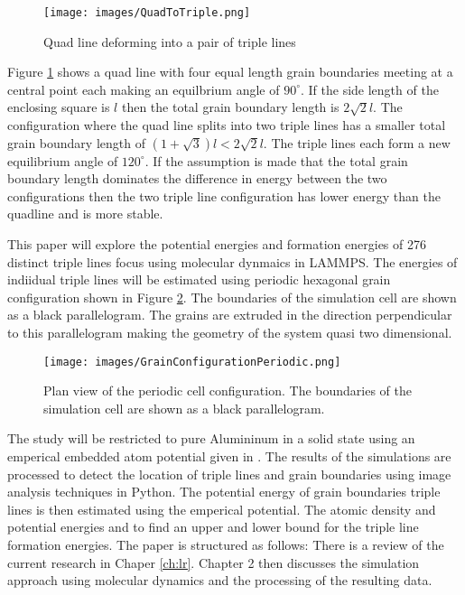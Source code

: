 \documentclass[12pt,a4paper]{book}
\begin{document}
\begin{figure}[H]
	\centering
	\texttt{[image: images/QuadToTriple.png]} 
	\label{fig:QuadToTriple}
	\caption{Quad line deforming into a pair of triple lines}
\end{figure}

Figure \ref{fig:QuadToTriple} shows a quad line with four equal length grain boundaries meeting at a central point each making an equilbrium angle of $90^{\circ}$. If the side length of the enclosing square is $l$ then the total grain boundary length is $2\sqrt{2}l$. The configuration where the quad line splits into two triple lines has a smaller total grain boundary length of $(1 + \sqrt{3})l < 2\sqrt{2}l$. The triple lines each form a new equilibrium angle of $120^{\circ}$. If the assumption is made that the total grain boundary length dominates the difference in energy between the two configurations then the two triple line configuration has lower energy than the quadline and is more stable. 

This paper will explore the potential energies and formation energies of 276 distinct triple lines focus using molecular dynmaics in LAMMPS. The energies of indiidual triple lines will be estimated using periodic hexagonal grain configuration shown in Figure \ref{fig:PerCell}. The boundaries of the simulation cell are shown as a black parallelogram. The grains are extruded in the direction perpendicular to this parallelogram making the geometry of the system quasi two dimensional.

\begin{figure}[H]
	\texttt{[image: images/GrainConfigurationPeriodic.png]}
	\label{fig:PerCell} 
	\caption{Plan view of the periodic cell configuration. The boundaries of the simulation cell are shown as a black parallelogram.}
\end{figure}

The study will be restricted to pure Alumininum in a solid state using an emperical embedded atom potential given in \cite{Zope2003}. The results of the simulations are processed to detect the location of triple lines and grain boundaries using image analysis techniques in Python. The potential energy of grain boundaries triple lines is then estimated using the emperical potential. The atomic density and potential energies and to find an upper and lower bound for the triple line formation energies. The paper is structured as follows: There is a review of the current research in Chaper \ref{ch:lr}. Chapter 2 then discusses the simulation approach using molecular dynamics and the processing of the resulting data.   
\end{document}
